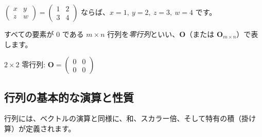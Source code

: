 \begin{ex}
$\begin{pmatrix} x & y \\ z & w \end{pmatrix} = \begin{pmatrix} 1 & 2 \\ 3 & 4 \end{pmatrix}$ ならば、$x=1,\ y=2,\ z=3,\ w=4$ です。
\end{ex}
\begin{dfn}[零行列]
すべての要素が $0$ である $m \times n$ 行列を\emph{零行列}といい、$\bm{O}$（または $\bm{O}_{m \times n}$）で表します。
\end{dfn}
\begin{ex}
$2 \times 2$ 零行列: $\bm{O} = \begin{pmatrix} 0 & 0 \\ 0 & 0 \end{pmatrix}$
\end{ex}

\subsection{行列の基本的な演算と性質}

行列には、ベクトルの演算と同様に、和、スカラー倍、そして特有の積（掛け算）が定義されます。

